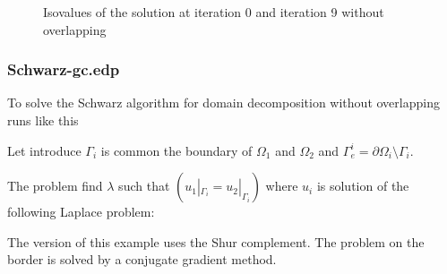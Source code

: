 \documentclass[a4paper,twoside,12pt]{book}
\def\p{\partial}
\begin{document}
\begin{figure}[hbt]
\caption{  Isovalues of the solution at  iteration 0  and iteration 9 without overlapping }
\end{figure}

\subsubsection{Schwarz-gc.edp}
To solve
the Schwarz algorithm for domain decomposition without overlapping  runs like this

Let introduce  $\Gamma_i$ is  common the boundary of $\Omega_1$ and
$\Omega_2$ and    $\Gamma_e^i= \p \Omega_i \setminus  \Gamma_i$.

The problem  find  $\lambda$ such that $ (u_1|_{\Gamma_i}=u_2|_{\Gamma_i}) $
where  $u_i$ is solution of the following Laplace problem:

The version of this example uses the  Shur complement. The  problem on the border 
is solved by a conjugate gradient method.
\end{document}
